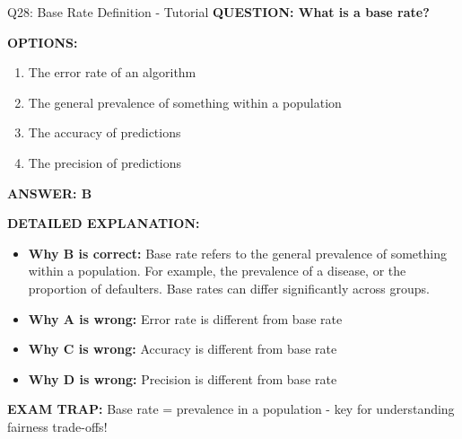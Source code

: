 \documentclass[8pt]{beamer}
\begin{document}
	\begin{frame}{Q28: Base Rate Definition - Tutorial}
		\fontsize{6.5}{7.5}\selectfont
		\textbf{QUESTION: What is a base rate?}
		
		\vspace{0.1cm}
		\textbf{OPTIONS:}
		\begin{enumerate}
			\item The error rate of an algorithm
			\item The general prevalence of something within a population
			\item The accuracy of predictions
			\item The precision of predictions
		\end{enumerate}
		
		\vspace{0.1cm}
		\textcolor{myblue}{\textbf{ANSWER: B}}
		
		\vspace{0.1cm}
		\textbf{DETAILED EXPLANATION:}
		\begin{itemize}
			\item \textbf{Why B is correct:} Base rate refers to the general prevalence of something within a population. For example, the prevalence of a disease, or the proportion of defaulters. Base rates can differ significantly across groups.
			\item \textbf{Why A is wrong:} Error rate is different from base rate
			\item \textbf{Why C is wrong:} Accuracy is different from base rate
			\item \textbf{Why D is wrong:} Precision is different from base rate
		\end{itemize}
		
		\textcolor{myred}{\textbf{EXAM TRAP:}} Base rate = \textcolor{myblue}{prevalence in a population} - key for understanding fairness trade-offs!
	\end{frame}
	
\end{document}
